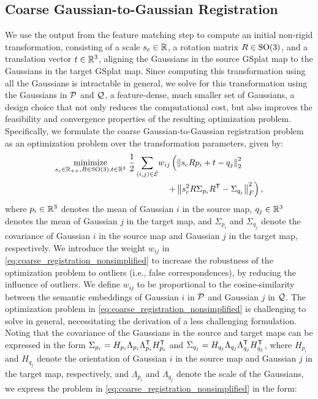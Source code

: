 \subsection{Coarse Gaussian-to-Gaussian Registration}
\label{sec:coarse_gaussian_to_gaussian_registration}
We use the output from the feature matching step to compute an initial non-rigid transformation, consisting of a scale ${s_{c} \in \mathbb{R}}$, a rotation matrix ${R \in \mathrm{SO}(3)}$, and a translation vector ${t \in \mathbb{R}^{3}}$, aligning the Gaussians in the source GSplat map to the Gaussians in the target GSplat map. Since computing this transformation using all the Gaussians is intractable in general, we solve for this transformation using the Gaussians in $\mathcal{P}$ and $\mathcal{Q}$, a feature-dense, much smaller set of Gaussians, a design choice that not only reduces the computational cost, but also improves the feasibility and convergence properties of the resulting optimization problem. Specifically, we formulate the coarse Gaussian-to-Gaussian registration problem as an optimization problem over the transformation parameters, given by:
\begin{equation}
    \label{eq:coarse_registration_nonsimplified}
    \begin{aligned}
        \underset{s_{c} \in \mathbb{R}_{++}, R \in \mathrm{SO}(3), t \in \mathbb{R}^{3}}{\mathrm{minimize}}\  \frac{1}{2} \sum_{(i, j) \in \mathcal{E}} & w_{ij} \left(\left\Vert s_{c}Rp_{i} + t - q_{j} \right\Vert_{2}^{2} \right. \\
        &\quad \left. + \left\Vert s_{c}^{2}R \Sigma_{p_{i}}R^{\mathsf{T}} - \Sigma_{q_{j}} \right\Vert_{F}^{2} \right),
    \end{aligned}
\end{equation}
where ${p_{i} \in \mathbb{R}^{3}}$ denotes the mean of Gaussian $i$ in the source map,  ${q_{j} \in \mathbb{R}^{3}}$ denotes the mean of Gaussian $j$ in the target map, and $\Sigma_{p_{i}}$ and $\Sigma_{q_{j}}$ denote the covariance of Gaussian $i$ in the source map and Gaussian $j$ in the target map, respectively. We introduce the weight $w_{ij}$ in \eqref{eq:coarse_registration_nonsimplified} to increase the robustness of the optimization problem to outliers (i.e., false correspondences), by reducing the influence of outliers. We define $w_{ij}$ to be proportional to the cosine-similarity between the semantic embeddings of Gaussian $i$ in $\mathcal{P}$ and Gaussian $j$ in $\mathcal{Q}$. The optimization problem in \eqref{eq:coarse_registration_nonsimplified} is challenging to solve in general, necessitating the derivation of a less challenging formulation. Noting that the covariance of the Gaussians in the source and target maps can be expressed in the form ${\Sigma_{p_{i}} = H_{p_{i}} \Lambda_{p_{i}} \Lambda_{p_{i}}^{\mathsf{T}} H_{p_{i}}^{\mathsf{T}}}$ and ${\Sigma_{q_{j}} = H_{q_{j}} \Lambda_{q_{j}} \Lambda_{q_{j}}^{\mathsf{T}} H_{q_{j}}^{\mathsf{T}}}$, where $H_{p_{i}}$ and $H_{q_{j}}$ denote the orientation of Gaussian $i$ in the source map and Gaussian $j$ in the target map, respectively, and $\Lambda_{p_{i}}$ and $\Lambda_{q_{j}}$ denote the scale of the Gaussians, we express the problem in \eqref{eq:coarse_registration_nonsimplified} in the form:
